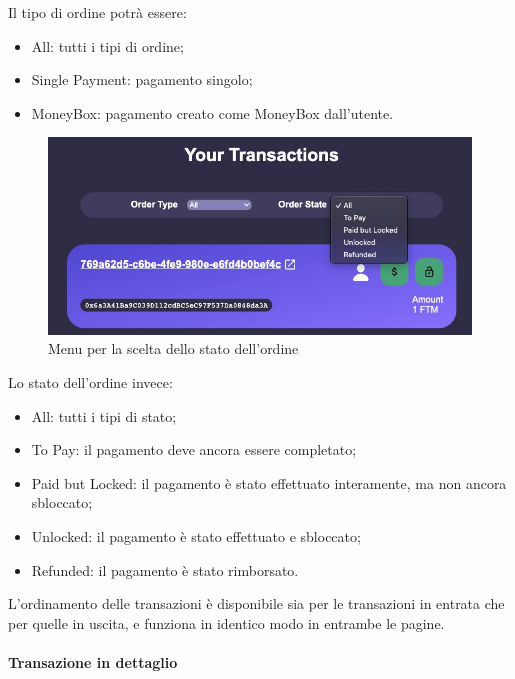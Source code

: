                 Il tipo di ordine potrà essere:
                \begin{itemize}
                    \item All: tutti i tipi di ordine;
                    \item Single Payment: pagamento singolo;
                    \item MoneyBox: pagamento creato come MoneyBox dall'utente.
                \end{itemize}

                \begin{figure}[H]
                    \centering
                    \includegraphics[scale=0.4]{immagini/orderstate.jpg}
                    \caption{Menu per la scelta dello stato dell'ordine}
                \end{figure}

                Lo stato dell'ordine invece:
                \begin{itemize}
                \item All: tutti i tipi di stato;
                    \item To Pay: il pagamento deve ancora essere completato;
                    \item Paid but Locked: il pagamento è stato effettuato interamente, ma non ancora sbloccato;
                    \item Unlocked: il pagamento è stato effettuato e sbloccato;
                    \item Refunded: il pagamento è stato rimborsato.
                \end{itemize}

                L'ordinamento delle transazioni è disponibile sia per le transazioni in entrata che per quelle in uscita, e funziona in identico modo in entrambe le pagine.

                \paragraph{Transazione in dettaglio}

